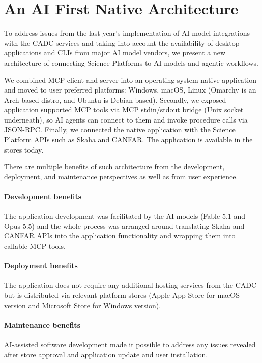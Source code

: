 \documentclass[11pt,twoside]{article}
\begin{document}
\section{An AI First Native Architecture}
To address issues from the last year's implementation of AI model integrations with the CADC services and taking into account the availability of desktop applications and CLIs from major AI model vendors, we present a new architecture of connecting Science Platforms to AI models and agentic workflows. 


We combined MCP client and server into an operating system native application and moved to user preferred platforms: Windows, macOS, Linux (Omarchy is an Arch based distro, and Ubuntu is Debian based). Secondly, we exposed application supported MCP tools via MCP stdin/stdout bridge (Unix socket underneath), so AI agents can connect to them and invoke procedure calls via JSON-RPC. Finally, we connected the native application with the Science Platform APIs such as Skaha and CANFAR. The application is available in the stores \citep{Zautkin2026Verbinal} today.

There are multiple benefits of such architecture from the development, deployment, and maintenance perspectives as well as from user experience. 

\paragraph{Development benefits}The application development was facilitated by the AI models (Fable 5.1 and Opus 5.5) and the whole process was arranged around translating Skaha and CANFAR APIs into the application functionality and wrapping them into callable MCP tools.

\paragraph{Deployment benefits}
The application does not require any additional hosting services from the CADC but is distributed via relevant platform stores (Apple App Store for macOS version and Microsoft Store for Windows version).

\paragraph{Maintenance benefits}
AI-assisted software development made it possible to address any issues revealed after store approval and application update and user installation.
\end{document}
